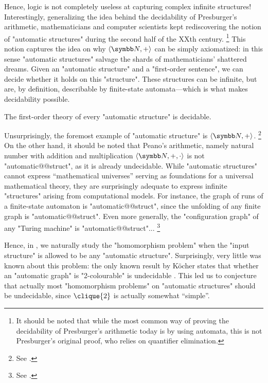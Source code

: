 Hence, logic is not completely useless at capturing complex infinite structures!
Interestingly, generalizing the idea behind the decidability of Presburger's arithmetic,
mathematicians and computer scientists kept 
rediscovering the notion of "automatic structures" during the second half
of the XXth century.%
\footnote{It should be noted that while the most common way of proving
the decidability of Presburger's arithmetic today is by using
automata, this is not Presburger's original proof, who relies on quantifier elimination.}
This notion captures the idea on why $\tup{\N,+}$ can be simply axiomatized:
in this sense "automatic structures" salvage the shards of mathematicians' shattered dreams.
Given an "automatic structure" and a "first-order sentence",
we can decide whether it holds on this "structure". These structures can be infinite,
but are, by definition, describable by finite-state automata---which is what
makes decidability possible.

\begin{known}
	The first-order theory of every "automatic structure" is decidable.
\end{known}

Unsurprisingly, the foremost example of "automatic structure" is $\tup{\N, +}$.%
\footnote{See .}
On the other hand, it should be noted that Peano's arithmetic, namely natural number with
addition and multiplication $\tup{\N,+,\cdot}$ is not "automatic@@struct",
as it is already undecidable.
While "automatic structures" cannot express ``mathematical universes'' serving as
foundations for a universal mathematical theory, they are surprisingly adequate to
express infinite "structures" arising from computational models.
For instance, the graph of runs of a finite-state automaton is "automatic@@struct",
since the unfolding of any finite graph is "automatic@@struct".
Even more generally, the "configuration graph" of any "Turing machine" is "automatic@@struct"...%
\footnote{See .}

Hence, in , we naturally study the "homomorphism problem" when the "input structure"
is allowed to be any "automatic structure". Surprisingly, very little was known about this problem:
the only known result by Köcher states that whether an "automatic graph" is "2-colourable" is undecidable \cite{Kocher2014AutomatischenGraphen}.
This led us to conjecture that actually most "homomorphism problems" on "automatic structures"
should be undecidable, since $\clique{2}$ is actually somewhat ``simple''.

